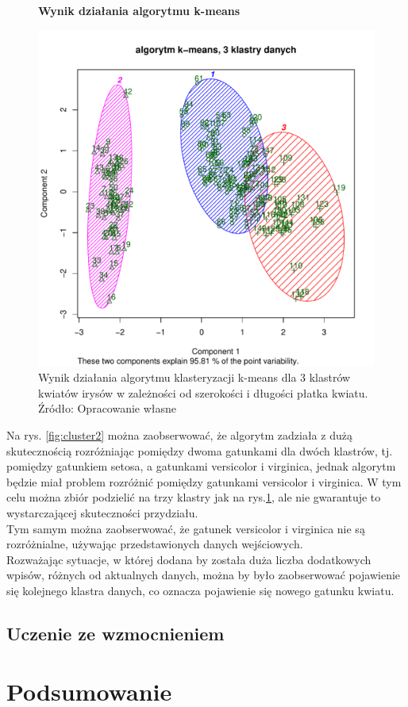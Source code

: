 \begin{figure}[h!]
    \centering
    \textbf{Wynik działania algorytmu k-means}\par\medskip
    \includegraphics[scale=0.4]{cluster3}
    \caption{Wynik działania algorytmu klasteryzacji k-means dla 3 klastrów kwiatów irysów w zależności od szerokości i 
długości płatka kwiatu. Źródło: Opracowanie własne}
    \label{fig:cluster3}
\end{figure}


Na rys. \ref{fig:cluster2} można zaobserwować, że algorytm zadziała z dużą skutecznością rozróżniając pomiędzy dwoma 
gatunkami dla dwóch klastrów, tj. pomiędzy gatunkiem setosa, a gatunkami versicolor i virginica, jednak algorytm będzie 
miał problem rozróżnić pomiędzy gatunkami versicolor i virginica.
W tym celu można zbiór podzielić na trzy klastry jak na rys.\ref{fig:cluster3}, ale nie gwarantuje to 
wystarczającej skuteczności przydziału. \\
Tym samym można zaobserwować, że gatunek versicolor i virginica nie są 
rozróżnialne, używając przedstawionych danych wejściowych.\\
Rozważając sytuacje, w której dodana by została duża liczba dodatkowych wpisów, różnych od aktualnych danych, 
można by było zaobserwować pojawienie się kolejnego klastra danych, co oznacza pojawienie się nowego gatunku kwiatu.


\subsection{Uczenie ze wzmocnieniem}
\label{subsec:uczeniezewzmocnieniem}






\section{Podsumowanie}












